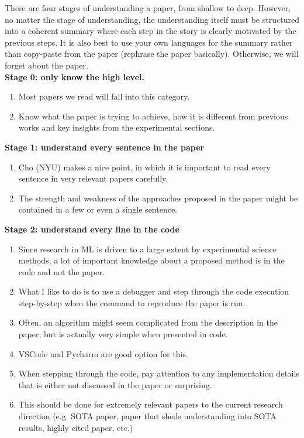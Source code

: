 \documentclass[11pt]{article}
\begin{document}
There are four stages of understanding a paper, from shallow to deep. However, no matter the stage of understanding, the understanding itself must be structured into a coherent summary where each step in the story is clearly motivated by the previous steps. It is also best to use your own languages for the summary rather than copy-paste from the paper (rephrase the paper basically). Otherwise, we will forget about the paper.
\\

\textbf{Stage 0: only know the high level.}

\begin{enumerate}
	\item Most papers we read will fall into this category.
	\item Know what the paper is trying to achieve, how it is different from previous works and key insights from the experimental sections.
\end{enumerate}

\textbf{Stage 1: understand every sentence in the paper}

\begin{enumerate}
	\item Cho (NYU) makes a nice point, in which it is important to read every sentence in very relevant papers carefully.
	\item The strength and weakness of the approaches proposed in the paper might be contained in a few or even a single sentence.
\end{enumerate}

\textbf{Stage 2: understand every line in the code}

\begin{enumerate}
	\item Since research in ML is driven to a large extent by experimental science methods, a lot of important knowledge about a proposed method is in the code and not the paper.
	\item What I like to do is to use a debugger and step through the code execution step-by-step when the command to reproduce the paper is run. 
	\item Often, an algorithm might seem complicated from the description in the paper, but is actually very simple when presented in code.
	\item VSCode and Pycharm are good option for this.
	\item When stepping through the code, pay attention to any implementation details that is either not discussed in the paper or surprising.
	\item This should be done for extremely relevant papers to the current research direction (e.g. SOTA paper, paper that sheds understanding into SOTA results, highly cited paper, etc.)
\end{enumerate}
\end{document}
